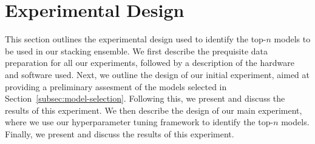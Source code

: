 \section{Experimental Design}\label{sec:methodology}
This section outlines the experimental design used to identify the top-$n$ models to be used in our stacking ensemble.
We first describe the prequisite data preparation for all our experiments, followed by a description of the hardware and software used.
Next, we outline the design of our initial experiment, aimed at providing a preliminary assesment of the models selected in Section~\ref{subsec:model-selection}.
Following this, we present and discuss the results of this experiment.
We then describe the design of our main experiment, where we use our hyperparameter tuning framework to identify the top-$n$ models.
Finally, we present and discuss the results of this experiment.



